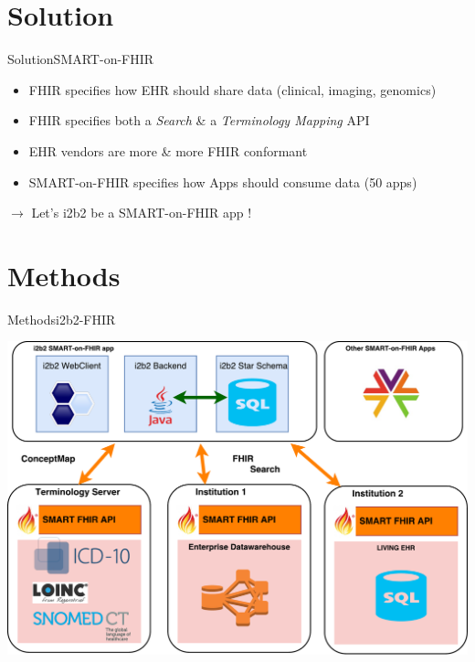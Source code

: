 \documentclass[10pt]{beamer}
\begin{document}
\section{Solution}
\begin{frame}{Solution}{SMART-on-FHIR}

\begin{itemize}
\item FHIR specifies how EHR should share data (clinical, imaging, genomics)
\item FHIR specifies both a \emph{Search} \& a \emph{Terminology Mapping} API
\item EHR vendors are more \& more FHIR conformant
\item SMART-on-FHIR specifies how Apps should consume data (50 apps)
\end{itemize}
$\rightarrow$ Let's i2b2 be a SMART-on-FHIR app !
\end{frame}

\section{Methods}
\begin{frame}{Methods}{i2b2-FHIR}

\includegraphics[height=.8\textheight]{images/overall.pdf}
\end{frame}

\end{document}
